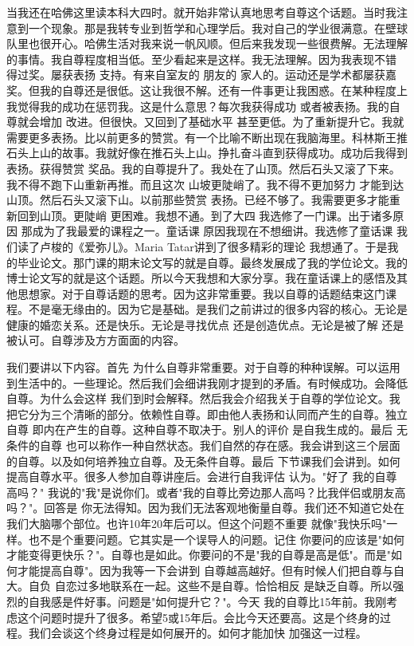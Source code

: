 当我还在哈佛这里读本科大四时。就开始非常认真地思考自尊这个话题。当时我注意到一个现象。那是我转专业到哲学和心理学后。我对自己的学业很满意。在壁球队里也很开心。哈佛生活对我来说一帆风顺。但后来我发现一些很费解。无法理解的事情。我自尊程度相当低。至少看起来是这样。我无法理解。因为我表现不错 得过奖。屡获表扬 支持。有来自室友的 朋友的 家人的。运动还是学术都屡获嘉奖。但我的自尊还是很低。这让我很不解。还有一件事更让我困惑。在某种程度上 我觉得我的成功在惩罚我。这是什么意思？每次我获得成功 或者被表扬。我的自尊就会增加 改进。但很快。又回到了基础水平 甚至更低。为了重新提升它。我就需要更多表扬。比以前更多的赞赏。有一个比喻不断出现在我脑海里。科林斯王推石头上山的故事。我就好像在推石头上山。挣扎奋斗直到获得成功。成功后我得到表扬。获得赞赏 奖品。我的自尊提升了。我处在了山顶。然后石头又滚了下来。我不得不跑下山重新再推。而且这次 山坡更陡峭了。我不得不更加努力 才能到达山顶。然后石头又滚下山。以前那些赞赏 表扬。已经不够了。我需要更多才能重新回到山顶。更陡峭 更困难。我想不通。到了大四 我选修了一门课。出于诸多原因 那成为了我最爱的课程之一。童话课 原因我现在不想细讲。我选修了童话课 我们读了卢梭的《爱弥儿》。Maria Tatar讲到了很多精彩的理论 我想通了。于是我的毕业论文。那门课的期末论文写的就是自尊。最终发展成了我的学位论文。我的博士论文写的就是这个话题。所以今天我想和大家分享。我在童话课上的感悟及其他思想家。对于自尊话题的思考。因为这非常重要。我以自尊的话题结束这门课程。不是毫无缘由的。因为它是基础。是我们之前讲过的很多内容的核心。无论是健康的婚恋关系。还是快乐。无论是寻找优点 还是创造优点。无论是被了解 还是被认可。自尊涉及方方面面的内容。 

我们要讲以下内容。首先 为什么自尊非常重要。对于自尊的种种误解。可以运用到生活中的。一些理论。然后我们会细讲我刚才提到的矛盾。有时候成功。会降低自尊。为什么会这样 我们到时会解释。然后我会介绍我关于自尊的学位论文。我把它分为三个清晰的部分。依赖性自尊。即由他人表扬和认同而产生的自尊。独立自尊 即内在产生的自尊。这种自尊不取决于。别人的评价 是自我生成的。最后 无条件的自尊 也可以称作一种自然状态。我们自然的存在感。我会讲到这三个层面的自尊。以及如何培养独立自尊。及无条件自尊。最后 下节课我们会讲到。如何提高自尊水平。很多人参加自尊讲座后。会进行自我评估 认为。"好了 我的自尊高吗？" 我说的"我"是说你们。或者"我的自尊比旁边那人高吗？比我伴侣或朋友高吗？"。回答是 你无法得知。因为我们无法客观地衡量自尊。我们还不知道它处在我们大脑哪个部位。也许10年20年后可以。但这个问题不重要 就像"我快乐吗"一样。也不是个重要问题。它其实是一个误导人的问题。记住 你要问的应该是"如何才能变得更快乐？"。自尊也是如此。你要问的不是"我的自尊是高是低"。而是"如何才能提高自尊"。因为我等一下会讲到 自尊越高越好。但有时候人们把自尊与自大。自负 自恋过多地联系在一起。这些不是自尊。恰恰相反 是缺乏自尊。所以强烈的自我感是件好事。问题是"如何提升它？"。今天 我的自尊比15年前。我刚考虑这个问题时提升了很多。希望5或15年后。会比今天还要高。这是个终身的过程。我们会谈这个终身过程是如何展开的。如何才能加快 加强这一过程。 

